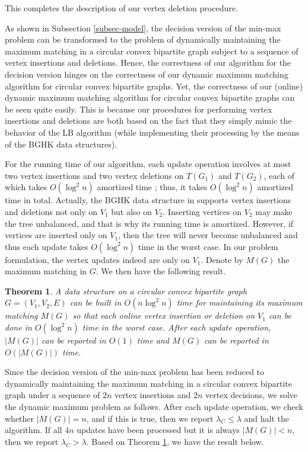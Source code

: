 \documentclass[11pt]{article}
\newtheorem{Theo}{Theorem}
\begin{document}
This completes the description of our vertex deletion procedure.

As shown in Subsection \ref{subsec-model}, the decision version of the min-max problem
can be transformed to the problem of dynamically maintaining the maximum matching
in a circular convex bipartite graph subject to a sequence of vertex insertions and deletions.
Hence, the correctness of our algorithm for the decision version hinges on the correctness
of our dynamic maximum matching algorithm for circular convex bipartite graphs.
Yet, the correctness of our (online) dynamic maximum matching algorithm for circular
convex bipartite graphs can be seen quite easily. This is because our procedures
for performing vertex insertions and deletions are both based on the fact that
they simply mimic the behavior of the LB algorithm (while
implementing their processing by the means of the BGHK data structures).

For the running time of our algorithm, each update operation involves
at most two vertex insertions and two vertex deletions on $T(G_1)$ and
$T(G_2)$, each of which takes $O(\log^2n)$ amortized time
\cite{ref:BrodalDy07}; thus, it takes $O(\log^2n)$ amortized time in total.
Actually, the BGHK data structure in \cite{ref:BrodalDy07} supports
vertex insertions and deletions not only on $V_1$ but also on $V_2$.
Inserting vertices on $V_2$ may make the tree unbalanced, and that is why its
running time is amortized. However, if vertices are inserted only on
$V_1$, then the tree will never become unbalanced and thus each update takes $O(\log^2n)$
time in the worst case. In our
problem formulation, the vertex updates indeed are only on $V_1$.
Denote by $M(G)$ the maximum matching in $G$. We then have the following result.


\begin{Theo}\label{theo:10}
A data structure on a circular convex bipartite graph
$G=(V_1,V_2,E)$ can be built in $O(n\log^2 n)$ time for
maintaining its maximum matching $M(G)$ so that each online
vertex insertion or deletion on $V_1$ can be done in $O(\log^2 n)$ time in the
worst case. After each update operation, $|M(G)|$ can be reported in
$O(1)$ time and $M(G)$ can be reported in $O(|M(G)|)$ time.
\end{Theo}

Since the decision version of the min-max problem
has been reduced to dynamically maintaining the maximum matching
in a circular convex bipartite graph
under a sequence of $2n$ vertex insertions and $2n$ vertex decisions,
we solve the dynamic maximum problem as follows.  After each update
operation, we check whether $|M(G)|=n$, and if this is true, then we report
$\lambda_C\leq \lambda$ and halt the algorithm. If all $4n$ updates have
been processed but it is always $|M(G)|<n$, then we report
$\lambda_C>\lambda$.  Based on Theorem \ref{theo:10}, we have the result below.
\end{document}
